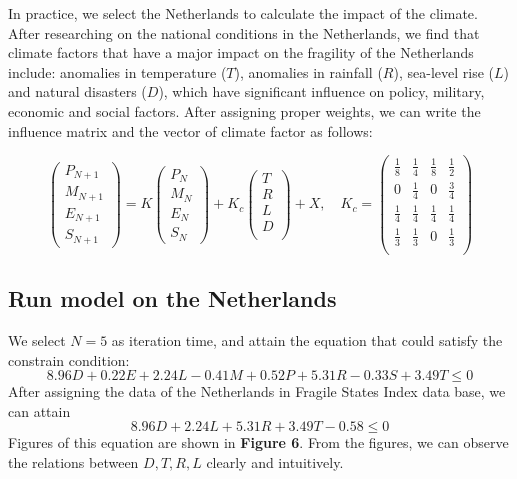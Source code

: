 \documentclass{mcmthesis}
\begin{document}
	In practice, we select the Netherlands to calculate the impact of the climate. After researching on the national conditions in the Netherlands, we find that climate factors that have a major impact on the fragility of the Netherlands include: anomalies in temperature ($T$), anomalies in rainfall ($R$), sea-level rise ($L$) and natural disasters ($D$), which have significant influence on policy, military, economic and social factors. After assigning proper weights, we can write the influence matrix and the vector of climate factor as follows:
	\begin{spacing}{1.5}
	$$
	\left(
	\begin{matrix}
	P_{N+1} \\ M_{N+1} \\ E_{N+1} \\ S_{N+1}
	\end{matrix}
	\right) 
	= 
	K 
	\left(
	\begin{matrix}
	P_N \\ M_N \\ E_N \\ S_N
	\end{matrix}
	\right) 
	+
	K_c
	\left(
	\begin{matrix}
	T \\ R \\ L \\ D \\
	\end{matrix}
	\right)
	+ X
	, \quad
	K_c = 
	\left(
	\begin{matrix}
		\frac{1}{8} & \frac{1}{4} & \frac{1}{8} & \frac{1}{2} \\
		0 & \frac{1}{4} & 0 & \frac{3}{4} \\
		\frac{1}{4} & \frac{1}{4} & \frac{1}{4} & \frac{1}{4} \\
		\frac{1}{3} & \frac{1}{3} & 0 & \frac{1}{3} \\
	\end{matrix}
	\right)
	$$
	\end{spacing}

	\subsection{Run model on the Netherlands}
	We select $N = 5$ as iteration time, and attain the equation that could satisfy the constrain condition:
	$$
	8.96D + 0.22E + 2.24L - 0.41M + 0.52P + 5.31R - 0.33S + 3.49T\leq0
	$$
	After assigning the data of the Netherlands in Fragile States Index data base, we can attain
	$$
	8.96D + 2.24L + 5.31R + 3.49T - 0.58\leq0
	$$
	Figures of this equation are shown in \textbf{Figure 6}. From the figures, we can observe the relations between $D,T,R,L$ clearly and intuitively.
	
\end{document}
